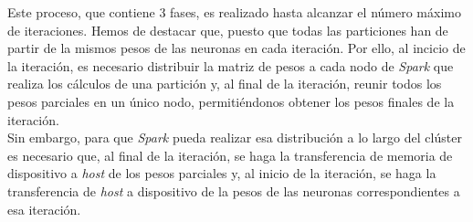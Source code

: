Este proceso, que contiene 3 fases, es realizado hasta alcanzar el número máximo de iteraciones. Hemos de destacar que, puesto que todas las particiones han de partir de la mismos pesos de las neuronas en cada iteración. Por ello, al incicio de la iteración, es necesario distribuir la matriz de pesos a cada nodo de \textit{Spark} que realiza los cálculos de una partición y, al final de la iteración, reunir todos los pesos parciales en un único nodo, permitiéndonos obtener los pesos finales de la iteración. \\

Sin embargo, para que \textit{Spark} pueda realizar esa distribución a lo largo del clúster es necesario que, al final de la iteración, se haga la transferencia de memoria de dispositivo a \textit{host} de los pesos parciales y, al inicio de la iteración, se haga la transferencia de \textit{host} a dispositivo de la pesos de las neuronas correspondientes a esa iteración.

